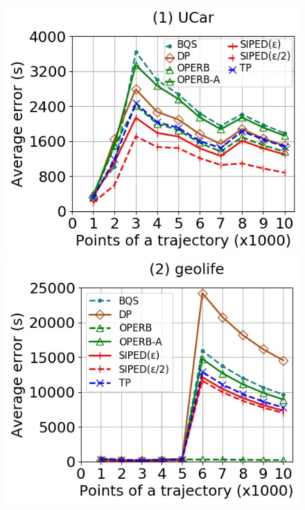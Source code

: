 {\begin{figure}[tb!]
	\centering
	\includegraphics[scale=0.350]{Figures/Exp-when-PED-error-size-service.jpg} 	\hspace{0.5ex}
	\includegraphics[scale=0.350]{Figures/Exp-when-PED-error-size-geolife.jpg}	\hspace{0.5ex}

\end{figure}}
